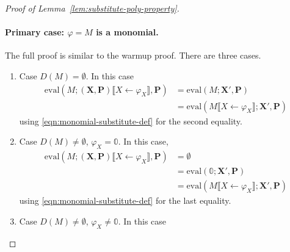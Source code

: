 \documentclass[10pt]{amsart}
\theoremstyle{plain}
\theoremstyle{definition}
\providecommand{\bP}[0]{\ensuremath{\mathbf P}\xspace}
\providecommand{\bX}[0]{\ensuremath{\mathbf X}\xspace}
\providecommand{\evalmap}[0]{\ensuremath{\mathrm{eval}}\xspace}
\begin{document}
\begin{proof}[Proof of Lemma~\ref{lem:substitute-poly-property}]
\paragraph{Primary case: $\varphi= M$ is a monomial.}
        The full proof is similar to the warmup proof. \allowdisplaybreaks
There are three cases. 
\begin{enumerate}[1.]
\item Case $D(M) = \emptyset$.
In this case 
\begin{align*}
\evalmap\left(M ; (\bX,\bP)\llbracket X\gets \varphi_X\rrbracket,\bP\right)
&= \evalmap\left(M ; \bX',\bP\right) \\
&= \evalmap\left(M\llbracket X\gets \varphi_X\rrbracket;\bX',\bP\right)
\end{align*}
using \eqref{eqn:monomial-substitute-def} for the second equality.

\item Case $D(M) \neq \emptyset$, $\varphi_X = \mathbb{0}$.
In this case, 
\begin{align*}
\evalmap\left(M ; (\bX,\bP)\llbracket X\gets \varphi_X\rrbracket,\bP\right)
&= \emptyset \\
&= \evalmap\left(\mathbb{0} ; \bX',\bP\right) \\
&= \evalmap\left(M\llbracket X\gets \varphi_X\rrbracket;\bX',\bP\right)
\end{align*}
using \eqref{eqn:monomial-substitute-def} for the last equality.


\item Case $D(M) \neq \emptyset$, $\varphi_X \neq \mathbb{0}$. In this case


\end{enumerate}
\end{proof}
\end{document}
